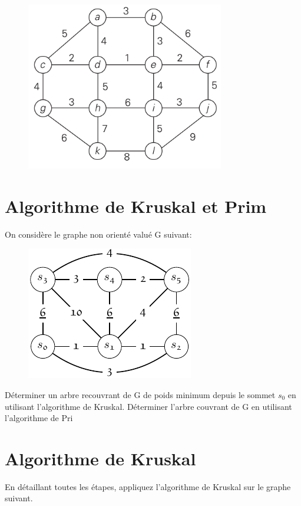 \documentclass{article}[12pt]
\begin{document}
\begin{figure}[h!]
    \centering
    \includegraphics[scale=0.8]{Prim-1.png}
    \label{fig:my_label}
\end{figure}

\section*{Algorithme de Kruskal et Prim}

On considère le graphe non orienté valué G suivant: 

\begin{figure}[h!]
    \centering
    \includegraphics{Kruskal-1.png}
    \label{fig:my_label}
\end{figure}


 Déterminer un arbre recouvrant de G de poids minimum depuis le sommet $s_0$ en utilisant l'algorithme de Kruskal. Déterminer l'arbre couvrant de G en utilisant l'algorithme de Pri
 
 \newpage
\section*{Algorithme de Kruskal}
En détaillant toutes les  étapes, appliquez l’algorithme de Kruskal sur le graphe
suivant.
\end{document}
